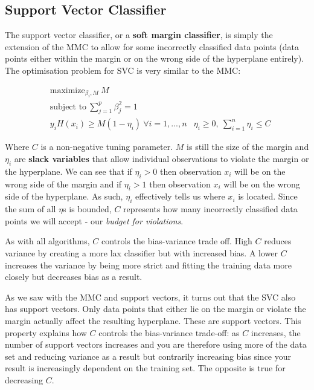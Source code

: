 \subsection{Support Vector Classifier}

The support vector classifier, or a \textbf{soft margin classifier}, is simply the extension of the MMC to allow for some incorrectly classified data points (data points either within the margin or on the wrong side of the hyperplane entirely). The optimisation problem for SVC is very similar to the MMC:

\begin{align*}
    &\text{maximize}_{\beta_{i},M}\: M \\
    &\text{subject to}\: \sum_{j=1}^{p}\beta_{j}^{2}=1 \\
    &y_{i}H(x_{i}) \ge M(1-\eta_{i})\: \forall i=1,...,n
    &\eta_{i}\ge 0,\: \sum^{n}_{i=1}\eta_{i}\le C
\end{align*}

Where $C$ is a non-negative tuning parameter. $M$ is still the size of the margin and $\eta_{i}$ are \textbf{slack variables} that allow individual observations to violate the margin or the hyperplane. We can see that if $\eta_{i}>0$ then observation $x_{i}$ will be on the wrong side of the margin and if $\eta_{i}>1$ then observation $x_{i}$ will be on the wrong side of the hyperplane. As such, $\eta_{i}$ effectively tells us where $x_{i}$ is located. Since the sum of all $\eta$s is bounded, $C$ represents how many incorrectly classified data points we will accept - our \textit{budget for violations}. 

As with all algorithms, $C$ controls the bias-variance trade off. High $C$ reduces variance by creating a more lax classifier but with increased bias. A lower $C$ increases the variance by being more strict and fitting the training data more closely but decreases bias as a result.

As we saw with the MMC and support vectors, it turns out that the SVC also has support vectors. Only data points that either lie on the margin or violate the margin actually affect the resulting hyperplane. These are support vectors. This property explains how $C$ controls the bias-variance trade-off: as $C$ increases, the number of support vectors increases and you are therefore using more of the data set and reducing variance as a result but contrarily increasing bias since your result is increasingly dependent on the training set. The opposite is true for decreasing $C$.
